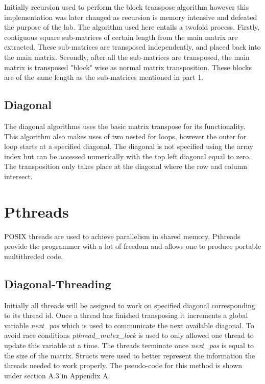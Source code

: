 \documentclass[10pt,journal]{article}
\begin{document}
Initially recursion used to perform the block transpose algorithm however this implementation was later changed as recursion is memory intensive and defeated the purpose of the lab. The algorithm used here entails a twofold process. Firstly, contiguous square sub-matrices of certain length from the main matrix are extracted. These sub-matrices are transposed independently, and placed back into the main matrix. Secondly, after all the sub-matrices are transposed, the main matrix is transposed "block" wise as normal matrix transposition. These blocks are of the same length as the sub-matrices mentioned in part 1. 

\subsection{Diagonal}

The diagonal algorithms uses the basic matrix transpose for its functionality. This algorithm also makes uses of two nested for loops, however the outer for loop starts at a specified diagonal. The diagonal is not specified using the array index but can be accessed numerically with the top left diagonal equal to zero. The transposition only takes place at the diagonal where the row and column intersect. 

\section{Pthreads}

POSIX threads are used to achieve parallelism in shared memory. Pthreads provide the programmer with a lot of freedom and allows one to produce portable multithreded code. 

\subsection{Diagonal-Threading}
 Initially all threads will be assigned to work on specified diagonal corresponding to its thread id. Once a thread has finished transposing it increments a global variable \textit {next\_pos} which is used to communicate the next available diagonal. To avoid race conditions \textit {pthread\_mutex\_lock} is used to only allowed one thread to update this variable at a time. The threads terminate once \textit {next\_pos} is equal to the size of the matrix. Structs were used to better represent the information the threads needed to work properly. The pseudo-code for this method is shown under section A.3 in Appendix A. 
\end{document}
